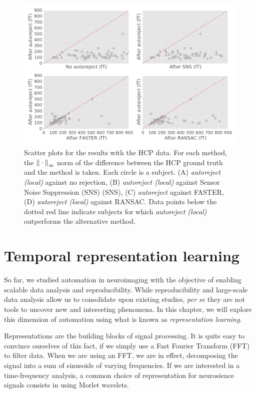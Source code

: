 \begin{figure}[htb!]
    \centering
    \includegraphics[width=\linewidth]{figures/figure4.pdf}
    \caption[Scatter plots for the results with the HCP data.]{Scatter plots for the results with the HCP data. For each method, the ${\| \cdot \|}_{\mathrm{\infty}}$ norm of the difference between the HCP ground truth and the method is taken. Each circle is a subject. (A) \textit{autoreject (local)} against no rejection, (B) \textit{autoreject (local)} against Sensor Noise Suppression (SNS) (SNS), (C) \textit{autoreject} against FASTER, (D) \textit{autoreject (local)} against RANSAC. Data points below the dotted red line indicate subjects for which \textit{autoreject (local)} outperforms the alternative method.}
    \label{fig:sommaire:hcp_scatter}
\end{figure}

\clearpage
\section*{Temporal representation learning}

So far, we studied automation in neuroimaging with the objective of enabling scalable data analysis and reproducibility. While  reproducibility and large-scale data analysis allow us to consolidate upon existing studies, \emph{per se} they are not tools to uncover new and interesting phenomena. In this chapter, we will explore this dimension of automation using what is known as \emph{representation learning}.

Representations are the building blocks of signal processing. It is quite easy to convince ourselves of this fact, if we simply use a Fast Fourier Transform (FFT) to filter data. When we are using an FFT, we are in effect, decomposing the signal into a sum of sinusoids of varying frequencies. If we are interested in a time-frequency analysis, a common choice of representation for neurosience signals consists in using Morlet wavelets.


